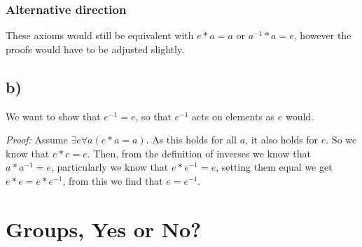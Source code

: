 \documentclass[]{scrartcl}
\begin{document}
\subsubsection{Alternative direction}
These axioms would still be equivalent with $e*a=a$ or $a^{-1}*a=e$, however the proofs would have to be adjusted slightly.

\subsection{b)}
We want to show that $e^{-1} = e$, so that $e^{-1}$ acts on elements as $e$ would.

\textit{Proof: } Assume $\exists e\forall a (e*a=a)$. As this holds for all $a$, it also holds for $e$. So we know that $e*e = e$. Then, from the definition of inverses we know that $a*a^{-1} = e$, particularly we know that $e*e^{-1}=e$, setting them equal we get $e * e = e* e^{-1}$, from this we find that $e = e^{-1}$.

\section{Groups, Yes or No?}
\end{document}
